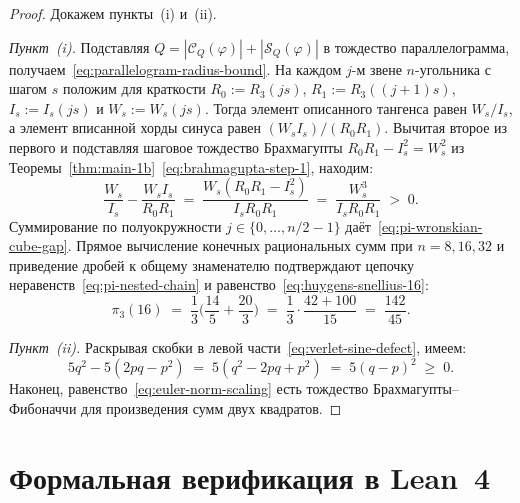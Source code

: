 \documentclass[11pt,a4paper]{article}
\theoremstyle{plain}
\theoremstyle{definition}
\begin{document}
\begin{proof}
Докажем пункты~(i) и~(ii).

\emph{Пункт~(i).} Подставляя $Q = |\mathcal{C}_Q(\varphi)| + |\mathcal{S}_Q(\varphi)|$ в тождество параллелограмма, получаем~\eqref{eq:parallelogram-radius-bound}. На каждом $j$-м звене $n$-угольника с шагом $s$ положим для краткости $R_0 := R_3(js)$, $R_1 := R_3((j+1)s)$, $I_s := I_s(js)$ и $W_s := W_s(js)$. Тогда элемент описанного тангенса равен $W_s / I_s$, а элемент вписанной хорды синуса равен $(W_s I_s)/(R_0 R_1)$. Вычитая второе из первого и подставляя шаговое тождество Брахмагупты $R_0 R_1 - I_s^2 = W_s^2$ из Теоремы~\ref{thm:main-1b}~\eqref{eq:brahmagupta-step-1}, находим:
\begin{equation*}
  \frac{W_s}{I_s} - \frac{W_s I_s}{R_0 R_1} \;=\; \frac{W_s(R_0 R_1 - I_s^2)}{I_s R_0 R_1} \;=\; \frac{W_s^3}{I_s R_0 R_1} \;>\; 0.
\end{equation*}
Суммирование по полуокружности $j \in \{0, \dots, n/2 - 1\}$ даёт~\eqref{eq:pi-wronskian-cube-gap}. Прямое вычисление конечных рациональных сумм при $n = 8, 16, 32$ и приведение дробей к общему знаменателю подтверждают цепочку неравенств~\eqref{eq:pi-nested-chain} и равенство~\eqref{eq:huygens-snellius-16}:
\begin{equation*}
  \pi_3(16) \;=\; \frac{1}{3}\biggl(\frac{14}{5} + \frac{20}{3}\biggr) \;=\; \frac{1}{3}\cdot\frac{42 + 100}{15} \;=\; \frac{142}{45}.
\end{equation*}

\emph{Пункт~(ii).} Раскрывая скобки в левой части~\eqref{eq:verlet-sine-defect}, имеем:
\begin{equation*}
  5q^2 - 5(2pq - p^2) \;=\; 5(q^2 - 2pq + p^2) \;=\; 5(q - p)^2 \;\ge\; 0.
\end{equation*}
Наконец, равенство~\eqref{eq:euler-norm-scaling} есть тождество Брахмагупты--Фибоначчи для произведения сумм двух квадратов.
\end{proof}

\section{Формальная верификация в Lean~4}
\label{sec:lean4}
\end{document}
